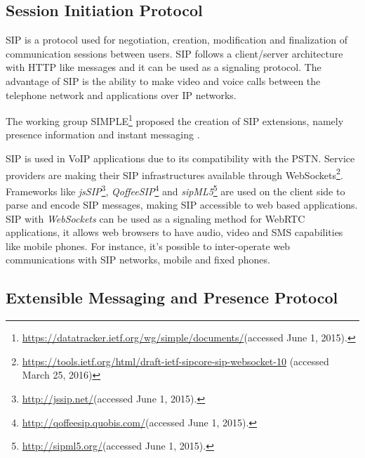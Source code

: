   \subsection{Session Initiation Protocol}

  \ac{SIP} \cite{rfc3261} is a protocol used for negotiation, creation, modification and finalization of communication sessions between users. \ac{SIP} follows a client/server architecture with \ac{HTTP} like messages and it can be used as a signaling protocol. The advantage of \ac{SIP} is the ability to make video and voice calls between the telephone network and applications over \ac{IP} networks.

  The working group \ac{SIMPLE}\footnote{\url{https://datatracker.ietf.org/wg/simple/documents/}(accessed June 1, 2015).} proposed the creation of \ac{SIP} extensions, namely presence information \cite{rfc5263} and instant messaging \cite{rfc3428}.

  \ac{SIP} is used in \ac{VoIP} applications due to its compatibility with the \ac{PSTN}.
  Service providers are making their \ac{SIP} infrastructures available through WebSockets\footnote{\url{https://tools.ietf.org/html/draft-ietf-sipcore-sip-websocket-10} (accessed March 25, 2016)}.
  Frameworks like \emph{jsSIP}\footnote{\url{http://jssip.net/}(accessed June 1, 2015).}, \emph{QoffeeSIP}\footnote{\url{http://qoffeesip.quobis.com/}(accessed June 1, 2015).} and \emph{sipML5}\footnote{\url{http://sipml5.org/}(accessed June 1, 2015).} are used on the client side to parse and encode \ac{SIP} messages, making \ac{SIP} accessible to web based applications. 
  \ac{SIP} with \emph{WebSockets} can be used as a signaling method for \ac{WebRTC} applications, it allows web browsers to have audio, video and \ac{SMS} capabilities like mobile phones. For instance, it's possible to inter-operate web communications with \ac{SIP} networks, mobile and fixed phones.

\subsection{Extensible Messaging and Presence Protocol}

